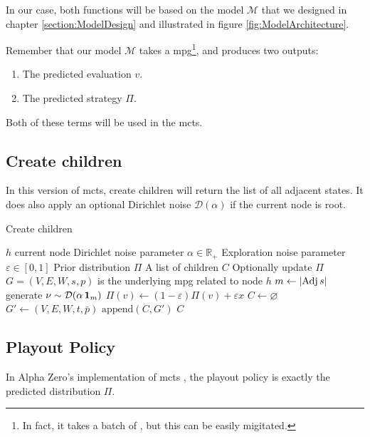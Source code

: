 In our case, both functions will be based on the model $\mathcal{M}$ that we designed in chapter \ref{section:ModelDesign} and illustrated in figure \ref{fig:ModelArchitecture}.

Remember that our model $\mathcal{M}$ takes a \acrshort{mpg}\footnote{In fact, it takes a batch of , but this can be easily migitated.}, and produces two outputs:
\begin{enumerate}
	\item The predicted evaluation $v.$
	\item The predicted strategy $\Pi.$
\end{enumerate}
Both of these terms will be used in the \acrshort{mcts}.

\subsection{Create children}
In this version of \acrshort{mcts}, create children will return the list of all adjacent states. It does also apply an optional Dirichlet noise $\mathcal{D}(\alpha)$ if the current node is root.

\begin{algorithm}[H]
	\caption{Create children}\label{alg:CreateChildren}
	\begin{algorithmic}
		\Require $h$ current
		 node
		 \Require Dirichlet noise parameter $\alpha\in\mathbb{R}_+$
		 \Require Exploration noise parameter $\varepsilon\in[0,1]$
		 \Require Prior distribution $\Pi$
		\Ensure A list of children $C$
		\Ensure Optionally update $\Pi$
		\State $G=(V,E,W,s,p)$ is the underlying \acrshort{mpg} related to node $h$
		\State $m\leftarrow \lvert \operatorname{Adj} s \rvert$
			\State generate $\nu\sim \mathcal{D}(\alpha \operatorname{\mathbf{1}}_m)$ 
				\State $\Pi(v)\leftarrow (1-\varepsilon)\Pi(v) + \varepsilon x$
			\EndFor
		\EndIf
		\State $C\leftarrow \varnothing$
			\State $G'\leftarrow (V,E,W,t,\bar{p})$
			\State $\text{append}(C,G')$
		\EndFor
		\State \Return $C$
	\end{algorithmic}
\end{algorithm}

\subsection{Playout Policy}
\label{section:RL:ModelBased:PlayoutPolicy}
In Alpha Zero's implementation of \acrshort{mcts} \cite{AlphaGo}, the playout policy is exactly the predicted distribution $\Pi.$

